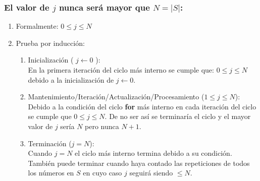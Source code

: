 \documentclass[12pt,spanish]{article}
\theoremstyle{definition}
\begin{document}
\subsubsection{El valor de $j$ nunca será mayor que $N = |S|$:}{}

\begin{enumerate}
\item Formalmente: $ 0  \le j  \le N $
\item Prueba por inducción:
    \begin{enumerate}
    \item Inicialización ( $j \leftarrow 0 $ ):\\
        En la primera iteración del ciclo más interno se cumple que: $ 0  \le j  \le N $ debido a la inicialización de $j \leftarrow 0$. 
    \item Mantenimiento/Iteración/Actualización/Procesamiento  ($ 1  \le j  \le N $):\\
        Debido a la condición del ciclo \textbf{for} más interno en cada iteración del ciclo se cumple que $ 0  \le j  \le N $. De no ser así se terminaría el ciclo y el mayor valor de $j$ sería $N$ pero nunca $N + 1 $.
    \item Terminación ($j = N $): \\
        Cuando $j = N $ el ciclo más interno termina debido a su condición.\\
        También puede terminar cuando haya contado las repeticiones de todos los números en $S$ en cuyo caso $j$ seguirá siendo $\le N$.
    \end{enumerate}
\end{enumerate}
\end{document}

